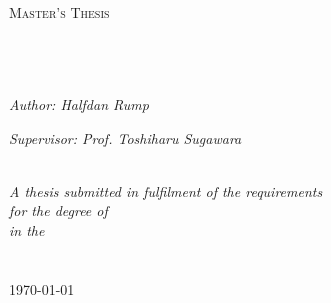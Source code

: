 \documentclass[11pt, a4paper, oneside]{Thesis} %
\begin{document}
\begin{titlepage}
\begin{center}

\textsc{\LARGE \univname}\\[1.5cm] %
\textsc{\Large Master's Thesis}\\[0.5cm] %

\HRule \\[0.4cm] %
{\huge \bfseries \ttitle}\\[0.4cm] %
\HRule \\[1.5cm] %
 
\begin{minipage}{0.4\textwidth}
\begin{flushleft} \large
\emph{Author: Halfdan Rump}\\
\end{flushleft}
\end{minipage}
\begin{minipage}{0.4\textwidth}
\begin{flushright} \large
\emph{Supervisor: Prof. Toshiharu Sugawara} \\
\end{flushright}
\end{minipage}\\[3cm]
 
\large \textit{A thesis submitted in fulfilment of the requirements\\ for the degree of \degreename}\\[0.3cm] %
\textit{in the}\\[0.4cm]
\groupname\\\deptname\\[2cm] %
 
{\large \today}\\[4cm] %
 
\vfill
\end{center}

\end{titlepage}




\end{document}
